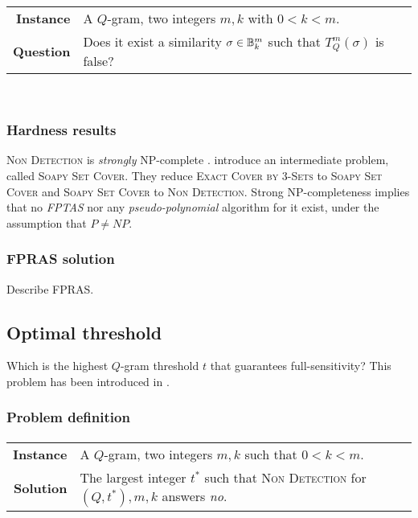 \paragraph{}
\begin{tabular}{rl}
{\bf Instance}	&	A $Q$-gram, two integers $m,k$ with $0 < k < m$. \\
{\bf Question}	&	Does it exist a similarity $\sigma \in \mathbb {B}^{m}_{k}$ such that $T_{Q}^{m}(\sigma)$ is false? \\
\end{tabular}
\\

\subsubsection{Hardness results}

\textsc{Non Detection} is \emph{strongly} NP-complete \citep{Nicolas2005}.
\citeauthor{Nicolas2005} introduce an intermediate problem, called \textsc{Soapy Set Cover}. They reduce \textsc{Exact Cover by 3-Sets} to \textsc{Soapy Set Cover} and \textsc{Soapy Set Cover} to \textsc{Non Detection}.
Strong NP-completeness implies that no \emph{FPTAS} nor any \emph{pseudo-polynomial} algorithm for it exist, under the assumption that $P \neq NP$.

\subsubsection{FPRAS solution}


Describe FPRAS.


\subsection{Optimal threshold}

Which is the highest $Q$-gram threshold $t$ that guarantees full-sensitivity?
This problem has been introduced in \citep{Burkhardt2001}. %

\subsubsection{Problem definition}

\paragraph{}
\begin{tabular}{rl}
{\bf Instance}	&	A $Q$-gram, two integers $m,k$ such that $0 < k < m$.\\
{\bf Solution}	&	The largest integer $t^*$ such that \textsc{Non Detection} for $(Q,t^*),m,k$ answers \emph{no}.\\
\end{tabular}
\\

